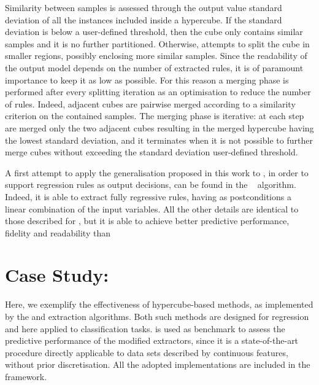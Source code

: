 \documentclass[
]{ceurart}
\begin{document}
Similarity between samples is assessed through the output value standard deviation of all the instances included inside a hypercube.
%
If the standard deviation is below a user-defined threshold, then the cube only contains similar samples and it is no further partitioned.
%
Otherwise, \gridex{} attempts to split the cube in smaller regions, possibly enclosing more similar samples.
%
Since the readability of the output model depends on the number of extracted rules, it is of paramount importance to keep it as low as possible.
%
For this reason a merging phase is performed after every splitting iteration as an optimisation to reduce the number of rules.
%
Indeed, adjacent cubes are pairwise merged according to a similarity criterion on the contained samples.
%
The merging phase is iterative: at each step are merged only the two adjacent cubes resulting in the merged hypercube having the lowest standard deviation, and it terminates when it is not possible to further merge cubes without exceeding the standard deviation user-defined threshold.

A first attempt to apply the generalisation proposed in this work to \gridex{}, in order to support regression rules as output decisions, can be found in the \gridrex{}~\cite{gridrex-kr2022} algorithm.
%
Indeed, it is able to extract fully regressive rules, having as postconditions a linear combination of the input variables.
%
All the other details are identical to those described for \gridex{}, but it is able to achieve better predictive performance, fidelity and readability than \gridex{}

\section{Case Study: \psyke}\label{sec:experiments}

Here, we exemplify the effectiveness of hypercube-based methods, as implemented by the \iter{} and \gridex{} extraction algorithms.
%
Both such methods are designed for regression and here applied to classification tasks.
%
\cart{} is used as benchmark to assess the predictive performance of the modified extractors, since it is a state-of-the-art procedure directly applicable to data sets described by continuous features, without prior discretisation.
%
All the adopted implementations are included in the \psyke{} framework\footnotemark.

\end{document}
